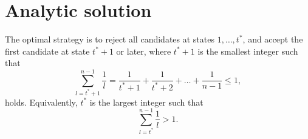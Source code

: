 
\section{Analytic solution}
\begin{theorem}\label{thm:optimal}
    The optimal strategy is to reject all candidates at states $1, \dots, t^*$, 
    and accept the first candidate at state $t^* + 1$ or later, where $t^*+1$ is the 
    smallest integer such that
    \[
    \sum_{l=t^*+1}^{n-1} \frac{1}{l} = \frac{1}{t^*+1} + \frac{1}{t^*+2} + \dots + \frac{1}{n-1} \leq 1,
    \]
    holds. Equivalently, $t^*$ is the largest integer such that
    \[
    \sum_{l=t^*}^{n-1} \frac{1}{l} > 1.
    \]
\end{theorem}
